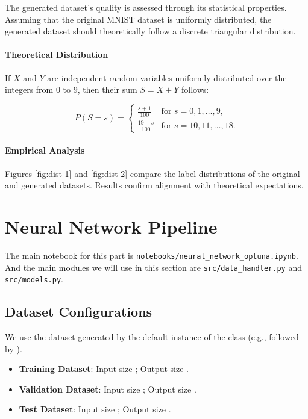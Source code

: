 \documentclass{article}
\begin{document}
The generated dataset's quality is assessed through its statistical properties. Assuming that the original MNIST dataset is uniformly distributed, the generated dataset should theoretically follow a discrete triangular distribution.

\paragraph{Theoretical Distribution}
If \(X\) and \(Y\) are independent random variables uniformly distributed over the integers from 0 to 9, then their sum \( S = X + Y \) follows:

\begin{equation}
\label{eq:dist}
    P(S = s) =
    \begin{cases}
    \frac{s+1}{100} & \text{for } s=0,1,\ldots,9, \\
    \frac{19 - s}{100} & \text{for } s=10,11,\ldots,18.
    \end{cases}
\end{equation}

\paragraph{Empirical Analysis} Figures \ref{fig:dist-1} and \ref{fig:dist-2} compare the label distributions of the original and generated datasets. Results confirm alignment with theoretical expectations.


\section{Neural Network Pipeline}

The main notebook for this part is \texttt{notebooks/neural\_network\_optuna.ipynb}. And 
the main modules we will use in this section are \texttt{src/data\_handler.py} and \texttt{src/models.py}.


\subsection{Dataset Configurations}

We use the dataset generated by the default instance of the  class (e.g.,   followed by ).

\begin{itemize}
\item \textbf{Training Dataset}: Input size ; Output size .
\item \textbf{Validation Dataset}: Input size ; Output size .
\item \textbf{Test Dataset}: Input size ; Output size .
\end{itemize}
\end{document}
